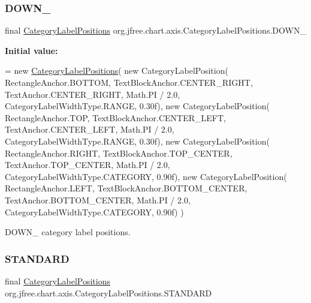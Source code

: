 \subsubsection{\texorpdfstring{D\+O\+W\+N\+\_}{DOWN\_90}}
{\footnotesize\ttfamily final \mbox{\hyperlink{classorg_1_1jfree_1_1chart_1_1axis_1_1_category_label_positions}{Category\+Label\+Positions}} org.\+jfree.\+chart.\+axis.\+Category\+Label\+Positions.\+D\+O\+W\+N\+\_\hspace{0.3cm}{\ttfamily [static]}}

{\bfseries Initial value\+:}
\begin{DoxyCode}
= \textcolor{keyword}{new} \mbox{\hyperlink{classorg_1_1jfree_1_1chart_1_1axis_1_1_category_label_positions_ac51d8b208b46dc8f7e5adfd72534d801}{CategoryLabelPositions}}(
            \textcolor{keyword}{new} CategoryLabelPosition(
                RectangleAnchor.BOTTOM, TextBlockAnchor.CENTER\_RIGHT,
                TextAnchor.CENTER\_RIGHT, Math.PI / 2.0,
                CategoryLabelWidthType.RANGE, 0.30f), 
            \textcolor{keyword}{new} CategoryLabelPosition(
                RectangleAnchor.TOP, TextBlockAnchor.CENTER\_LEFT,
                TextAnchor.CENTER\_LEFT, Math.PI / 2.0,
                CategoryLabelWidthType.RANGE, 0.30f), 
            \textcolor{keyword}{new} CategoryLabelPosition(
                RectangleAnchor.RIGHT, TextBlockAnchor.TOP\_CENTER,
                TextAnchor.TOP\_CENTER, Math.PI / 2.0,
                CategoryLabelWidthType.CATEGORY, 0.90f), 
            \textcolor{keyword}{new} CategoryLabelPosition(
                RectangleAnchor.LEFT, TextBlockAnchor.BOTTOM\_CENTER,
                TextAnchor.BOTTOM\_CENTER, Math.PI / 2.0,
                CategoryLabelWidthType.CATEGORY, 0.90f) 
        )
\end{DoxyCode}
D\+O\+W\+N\+\_ category label positions. \mbox{\label{classorg_1_1jfree_1_1chart_1_1axis_1_1_category_label_positions_a4ae6cf55e351213bf7c032df932b35a0}} 
\subsubsection{\texorpdfstring{S\+T\+A\+N\+D\+A\+RD}{STANDARD}}
{\footnotesize\ttfamily final \mbox{\hyperlink{classorg_1_1jfree_1_1chart_1_1axis_1_1_category_label_positions}{Category\+Label\+Positions}} org.\+jfree.\+chart.\+axis.\+Category\+Label\+Positions.\+S\+T\+A\+N\+D\+A\+RD\hspace{0.3cm}{\ttfamily [static]}}

